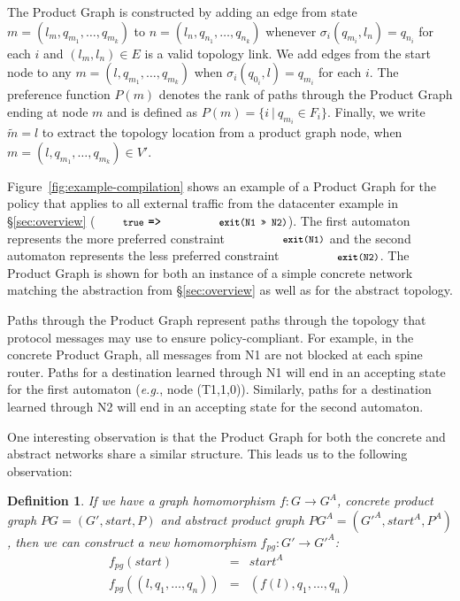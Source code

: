 \documentclass[numbers, 10pt, preprint]{sigplanconf}
\newcommand{\EG}{\emph{e.g.}}
\newcommand{\set}[1]{\ensuremath{\{ #1 \} }}
\newcommand{\CD}[1]{\texttt{\small #1}}  %
\newcommand{\KW}[1]{\texttt{\small\bfseries{#1}}}
\newcommand{\True}{\CD{true}}
\newcommand{\Prefer}{\texttt{>>}}
\newcommand{\Path}{\texttt{=>}}
\newcommand{\Exit}{\KW{exit}}
\newtheorem{defn}{Definition}
\begin{document}
The Product Graph is constructed by adding an edge from state $m = (l_m, q_{m_1}, \dots, q_{m_k})$ to $n = (l_n, q_{n_1}, \dots, q_{n_k})$ whenever $\sigma_i(q_{m_i}, l_n) = q_{n_i}$ for each $i$ and $(l_m,l_n) \in E$ is a valid topology link.
%
We add edges from the start node to any $m = (l, q_{m_1}, \dots, q_{m_k})$ when $\sigma_i(q_{0_i}, l) = q_{m_i}$ for each $i$.
%
The preference function $P(m)$ denotes the rank of paths through the Product Graph ending at node $m$ and is defined as $P(m) = \set{i~\vert~q_{m_i} \in F_i}$.
%
Finally, we write $\tilde{m} = l$ to extract the topology location from a product graph node, when $m = (l, q_{m_1}, \dots, q_{m_k}) \in V'$.

Figure~\ref{fig:example-compilation} shows an example of a Product Graph for the policy that applies to all external traffic from the datacenter example in \S\ref{sec:overview} ($\True ~\Path~ \CD{\Exit(N1 \Prefer~N2)}$).
%
%
The first automaton represents the more preferred constraint $\CD{\Exit(N1)}$ and the second automaton represents the less preferred constraint $\CD{\Exit(N2)}$. The Product Graph is shown for both an instance of a simple concrete network matching the abstraction from \S\ref{sec:overview} as well as for the abstract topology.

Paths through the Product Graph represent paths through the topology that protocol messages may use to ensure policy-compliant. For example, in the concrete Product Graph, all messages from N1 are not blocked at each spine router. Paths for a destination learned through N1 will end in an accepting state for the first automaton (\EG, node (T1,1,0)). Similarly, paths for a destination learned through N2 will end in an accepting state for the second automaton. 

One interesting observation is that the Product Graph for both the concrete and abstract networks share a similar structure. This leads us to the following observation:

\begin{defn}
If we have a graph homomorphism $f : G \rightarrow G^A$, concrete product graph $PG = (G',\mathit{start},P)$ and abstract product graph $PG^A = (G'^A, \mathit{start}^A, P^A)$, then we can construct a new homomorphism $f_{pg} : G' \rightarrow G'^A$:
\[ \begin{array}{rcl}
  f_{pg}( \mathit{start} ) & = & \mathit{start}^A  \\
  f_{pg}( (l,q_1,\ldots,q_n) ) & = & (f(l),q_1,\ldots,q_n) \\
\end{array} \]
\end{defn}
\end{document}
